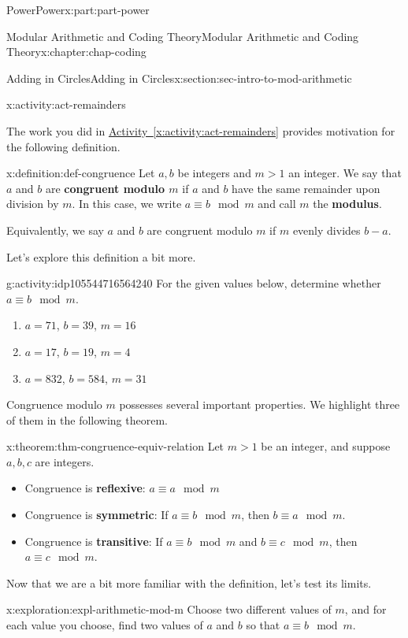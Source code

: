 \documentclass[oneside,10pt,]{book}
\newcommand{\xreffont}{\relax}
\newcommand{\terminology}[1]{\textbf{#1}}
\numberwithin{equation}{section}
\newcommand{\gt}{>}
\begin{document}
\begin{partptx}{Power}{}{Power}{}{}{x:part:part-power}
\begin{chapterptx}{Modular Arithmetic and Coding Theory}{}{Modular Arithmetic and Coding Theory}{}{}{x:chapter:chap-coding}
\begin{sectionptx}{Adding in Circles}{}{Adding in Circles}{}{}{x:section:sec-intro-to-mod-arithmetic}
\begin{activity}{}{x:activity:act-remainders}
\begin{enumerate}
\end{enumerate}
\end{activity}%
The work you did in \hyperref[x:activity:act-remainders]{Activity~{\xreffont\ref{x:activity:act-remainders}}} provides motivation for the following definition.%
\begin{definition}{}{x:definition:def-congruence}%
%
%
Let \(a,b\) be integers and \(m \gt 1\) an integer. We say that \(a\) and \(b\) are \terminology{congruent modulo \(m\)} if \(a\) and \(b\) have the same remainder upon division by \(m\). In this case, we write \(a\equiv b\mod m\) and call \(m\) the \terminology{modulus}.%
\par
Equivalently, we say \(a\) and \(b\) are congruent modulo \(m\) if \(m\) evenly divides \(b-a\).%
\end{definition}
Let's explore this definition a bit more.%
\begin{activity}{}{g:activity:idp105544716564240}%
For the given values below, determine whether \(a \equiv b\mod m\).%
%
\begin{enumerate}
\item{}\(a = 71\), \(b = 39\), \(m= 16\)%
\item{}\(a = 17\), \(b = 19\), \(m = 4\)%
\item{}\(a = 832\), \(b = 584\), \(m= 31\)%
\end{enumerate}
\end{activity}%
Congruence modulo \(m\) possesses several important properties. We highlight three of them in the following theorem.%
\begin{theorem}{}{}{x:theorem:thm-congruence-equiv-relation}%
Let \(m\gt 1\) be an integer, and suppose \(a,b,c\) are integers.%
%
\begin{itemize}[label=\textbullet]
\item{}Congruence is \terminology{reflexive}: \(a\equiv a\mod m\)%
\item{}Congruence is \terminology{symmetric}: If \(a\equiv b\mod m\), then \(b\equiv a\mod m\).%
\item{}Congruence is \terminology{transitive}: If \(a\equiv b\mod m\) and \(b\equiv c\mod m\), then \(a\equiv c\mod m\).%
\end{itemize}
\end{theorem}
Now that we are a bit more familiar with the definition, let's test its limits.%
\begin{exploration}{}{x:exploration:expl-arithmetic-mod-m}%
Choose two different values of \(m\), and for each value you choose, find two values of \(a\) and \(b\) so that \(a\equiv b\mod m\).%

\end{exploration}
\end{sectionptx}
\end{chapterptx}
\end{partptx}
\end{document}
